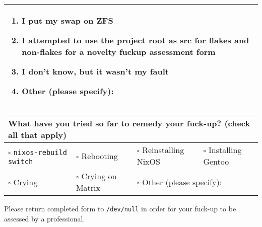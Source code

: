 \documentclass{article}
\begin{document}
\begin{tabularx}{\textwidth}{|X|}
\begin{enumerate}[label={\(\square\)},noitemsep,topsep=0pt,leftmargin=*]
    \item I put my swap on ZFS
    \item I attempted to use the project root as src for flakes and non-flakes
      for a novelty fuckup assessment form
    \item I don't know, but it wasn't my fault
    \item Other (please specify): \dotfill \vspace*{-\baselineskip}
\end{enumerate} \\ \hline
\end{tabularx}

\vspace{0.5em}

\begin{tabularx}{\textwidth}{|lllX|}
\hline
\multicolumn{4}{|l|}{\textbf{What have you tried so far to remedy your fuck-up?} (check all that apply)} \\ \hline
\(\square\) \texttt{nixos-rebuild switch} &
\(\square\) Rebooting &
\(\square\) Reinstalling NixOS &
\(\square\) Installing Gentoo \\

\(\square\) Crying &
\(\square\) Crying on Matrix &
\multicolumn{2}{l|}{\(\square\) Other (please specify): \dotfill} \\ \hline
\end{tabularx}

\vspace*{\fill}
\begin{center}
Please return completed form to \texttt{/dev/null} in order for your fuck-up to be assessed by a professional.
\end{center}
\end{document}
